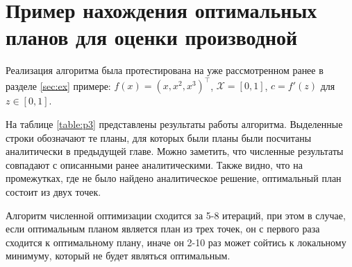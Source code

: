 \documentclass[specialist,
               substylefile = spbu.rtx,
               subf,href,colorlinks=true, 12pt]{disser}
\theoremstyle{definition}
\begin{document}
	\section{Пример нахождения оптимальных планов для оценки производной}
	Реализация алгоритма была протестирована на уже рассмотренном ранее в разделе \ref{sec:ex} примере: $f(x) = (x, x^2, x^3)^\top$, $\mathcal{X} = [0, 1]$, $c = f'(z)$ для $z \in [0, 1]$.
	
	На таблице \ref{table:p3} представлены результаты работы алгоритма. Выделенные строки обозначают те планы, для которых были планы были посчитаны аналитически в предыдущей главе. Можно заметить, что численные результаты совпадают с описанными ранее аналитическими. Также видно, что на промежутках, где не было найдено аналитическое решение, оптимальный план состоит из двух точек.
	
	Алгоритм численной оптимизации сходится за 5-8 итераций, при этом в случае, если оптимальным планом является план из трех точек, он с первого раза сходится к оптимальному плану, иначе он 2-10 раз может сойтись к локальному минимуму, который не будет являться оптимальным. 
	
\end{document}
